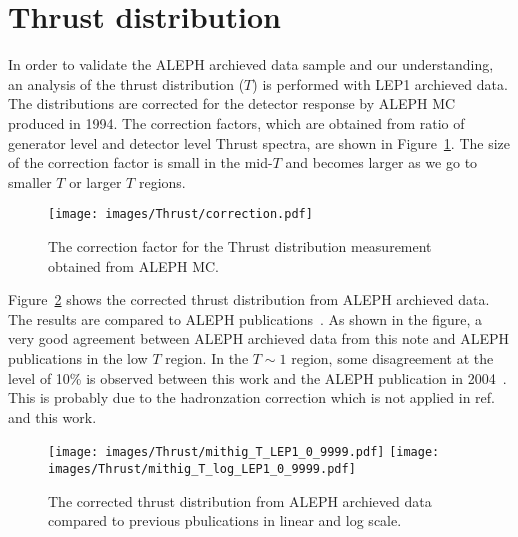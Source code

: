 \section{Thrust distribution}

In order to validate the ALEPH archieved data sample and our understanding,
an analysis of the thrust distribution ($T$) is performed with LEP1 archieved
data. The distributions are corrected for the detector response by ALEPH MC
produced in 1994. The correction factors, which are obtained from ratio of generator level and detector level Thrust spectra, are shown in Figure~\ref{fig:ThrustCorr}. The size of the correction factor is small in the mid-$T$
and becomes larger as we go to smaller $T$ or larger $T$ regions.

\begin{figure}[H]
\centering
\texttt{[image: images/Thrust/correction.pdf]}
\caption{The correction factor for the Thrust distribution measurement obtained from ALEPH MC.}
\label{fig:ThrustCorr}
\end{figure}

Figure~\ref{fig:ThrustResults} shows the corrected thrust distribution from ALEPH archieved data. The results are compared to ALEPH
publications~\cite{Barate:1996fi,heister:2003aj}. As shown in the figure, a very good agreement between ALEPH archieved data from this note
and ALEPH publications in the low $T$ region. In the $T\sim 1$ region, some disagreement at the level of 10\% is observed between this work
and the ALEPH publication in 2004~\cite{heister:2003aj}. This is probably due to the hadronzation correction which is not applied in
ref.~\cite{Barate:1996fi} and this work. 


\begin{figure}[H]
\centering
\texttt{[image: images/Thrust/mithig\_T\_LEP1\_0\_9999.pdf]}
\texttt{[image: images/Thrust/mithig\_T\_log\_LEP1\_0\_9999.pdf]}
\caption{The corrected thrust distribution from ALEPH archieved data compared to previous pbulications in linear and log scale.}
\label{fig:ThrustResults}
\end{figure}
